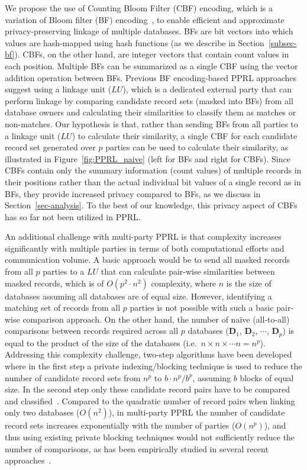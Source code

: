 \documentclass{sig-alternate}
\begin{document}
We propose the use of Counting Bloom Filter (CBF) encoding, which is a variation of Bloom filter (BF) encoding~\cite{Vat13}, to enable efficient and approximate privacy-preserving linkage of multiple databases. 
BFs are bit vectors into which values are hash-mapped using hash functions (as we describe in Section~\ref{subsec-bf}). CBFs, on the other hand, are integer vectors that contain count values in each position. Multiple BFs can be summarized as a single CBF using the vector addition operation between BFs.
Previous BF encoding-based PPRL approaches~\cite{Dur12,Sch09} suggest using a linkage unit ($LU$), which is a dedicated external party that can perform linkage by comparing candidate record sets (masked into BFs) from all database owners and calculating their similarities to classify them as matches or non-matches.
Our hypothesis is that, rather than sending BFs from all parties to a linkage unit ($LU$) to calculate their similarity, a single CBF for each candidate record set generated over $p$ parties can be used to calculate their similarity, as illustrated in Figure~\ref{fig:PPRL_naive} (left for BFs and right for CBFs).
Since CBFs contain only the summary information (count values) of multiple records in their positions rather than the actual individual bit values of a single record as in BFs, they 
provide increased privacy compared to BFs, as we discuss in Section~\ref{sec-analysis}. To the best of our knowledge, this privacy aspect of CBFs has so far not been utilized in PPRL.

An additional challenge with multi-party PPRL is that complexity 
increases significantly with multiple parties in terms of both computational efforts and communication volume.
A basic approach would be to send all masked records from all $p$ parties to a $LU$ that can calculate pair-wise similarities between masked records, which is of $O(p^2 \cdot n^2)$ complexity, where $n$ is the size of databases assuming all databases are of equal size. However, identifying a matching set of records from all $p$ parties is not possible with such a basic pair-wise comparison approach.
On the other hand, the number of na\"{i}ve (all-to-all) comparisons between records required across all $p$ databases ($\mathbf{D}_1$, $\mathbf{D}_2$, $\cdots$, $\mathbf{D}_p$) is equal to the product of the size of the databases (i.e.\ $n \times n \times \cdots n = n^p$). 
Addressing this complexity challenge, two-step algorithms have been developed where in the first step a private indexing/blocking technique is used to reduce the number of candidate record sets from $n^p$ to $b \cdot n^p/b^p$, assuming $b$ blocks of equal size. In the second step only these candidate record pairs have to be compared and classified~\cite{Vat13}. 
Compared to the quadratic number of record pairs when linking only two databases ($O(n^2)$), in multi-party PPRL the number of candidate record sets increases exponentially with the number of parties ($O(n^p)$), and thus using existing private blocking techniques would not sufficiently reduce the number of comparisons, as has been empirically studied in several recent approaches~\cite{Ran14,Ran15,Vat14c}. 
\end{document}
